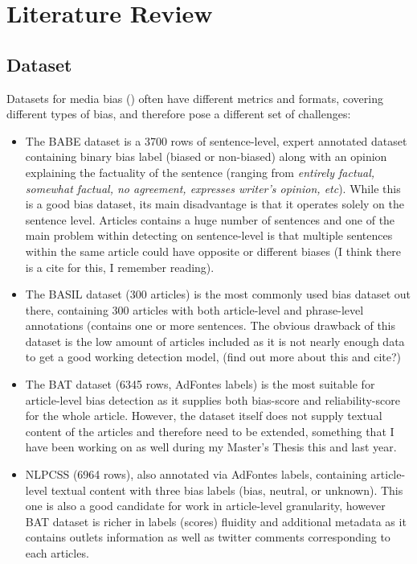 \chapter{Literature Review}
\label{cha:3}

\section{Dataset}

Datasets for media bias (\cite{spinde-2021-babe, spinde-2023-bat, fan-2019-basil, chen-etal-2020-nlpcss}) often have different metrics and formats, covering different types of bias, and therefore pose a different set of challenges:
\begin{itemize}
    \item The BABE dataset \cite{spinde-2021-babe} is a 3700 rows of sentence-level, expert annotated dataset containing binary bias label (biased or non-biased) along with an opinion explaining the factuality of the sentence (ranging from \textit{entirely factual, somewhat factual, no agreement, expresses writer's opinion, etc}). While this is a good bias dataset, its main disadvantage is that it operates solely on the sentence level. Articles contains a huge number of sentences and one of the main problem within detecting on sentence-level is that multiple sentences within the same article could have opposite or different biases (I think there is a cite for this, I remember reading).
    \item The BASIL dataset \cite{fan-2019-basil} (300 articles) is the most commonly used bias dataset out there, containing 300 articles with both article-level and phrase-level annotations (contains one or more sentences. The obvious drawback of this dataset is the low amount of articles included as it is not nearly enough data to get a good working detection model, (find out more about this and cite?)
    \item The BAT \cite{spinde-2023-bat} dataset (6345 rows, AdFontes labels) is the most suitable for article-level bias detection as it supplies both bias-score and reliability-score for the whole article. However, the dataset itself does not supply textual content of the articles and therefore need to be extended, something that I have been working on as well during my Master's Thesis this and last year.
    \item NLPCSS \cite{chen-etal-2020-nlpcss} (6964 rows),  also annotated via AdFontes labels, containing article-level textual content with three bias labels (bias, neutral, or unknown). This one is also a good candidate for work in article-level granularity, however BAT dataset is richer in labels (scores) fluidity and additional metadata as it contains outlets information as well as twitter comments corresponding to each articles.
\end{itemize}

